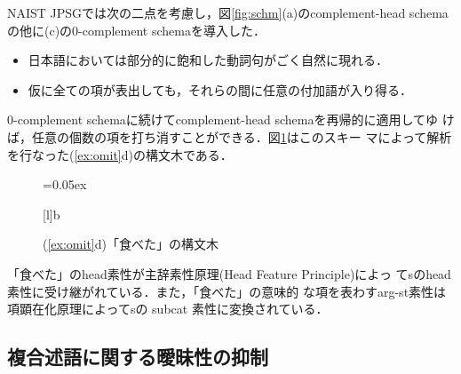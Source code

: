 NAIST JPSGでは次の二点を考慮し，図\ref{fig:schm}(a)のcomplement-head
schemaの他に(c)の0-complement schemaを導入した．
\begin{itemize}
\item [1.] 日本語においては部分的に飽和した動詞句がごく自然に現れる．
\item [2.] 仮に全ての項が表出しても，それらの間に任意の付加語が入り得る．
\end{itemize}
0-complement schemaに続けてcomplement-head schemaを再帰的に適用してゆ
けば，任意の個数の項を打ち消すことができる．図\ref{fig:go}はこのスキー
マによって解析を行なった(\ref{ex:omit}d)の構文木である．
\begin{figure}
\begin{center}
\unitlength=0.05ex
\end{center}
[l]{b}
\caption{(\ref{ex:omit}d)「食べた」の構文木}\label{fig:go}
\end{figure}
「食べた」の{\sc head}素性が主辞素性原理(Head Feature Principle)によっ
て{\sc s}の{\sc head}素性に受け継がれている．また，「食べた」の意味的
な項を表わす{\sc arg-st}素性は項顕在化原理によって{\sc s}の{\sc
subcat} 素性に変換されている．


\subsection{複合述語に関する曖昧性の抑制}\label{sec:jpsg:atree}

